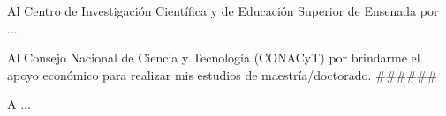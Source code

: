 
\hspace{12pt}

Al Centro de Investigación Científica y de Educación Superior de Ensenada por ....
\bigskip

Al Consejo Nacional de Ciencia y Tecnología (CONACyT) por brindarme el apoyo econ\'omico para realizar mis estudios de maestría/doctorado. \#\#\#\#\#\#
\bigskip

A ...